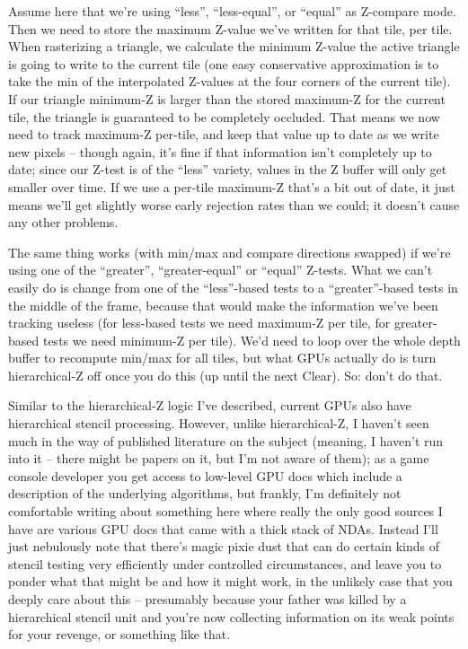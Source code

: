\documentclass[12pt]{article}
\begin{document}
Assume here that we’re using “less”, “less-equal”, or “equal” as Z-compare mode. Then we need to store the maximum Z-value we’ve written for that tile, per tile. When rasterizing a triangle, we calculate the minimum Z-value the active triangle is going to write to the current tile (one easy conservative approximation is to take the min of the interpolated Z-values at the four corners of the current tile). If our triangle minimum-Z is larger than the stored maximum-Z for the current tile, the triangle is guaranteed to be completely occluded. That means we now need to track maximum-Z per-tile, and keep that value up to date as we write new pixels – though again, it’s fine if that information isn’t completely up to date; since our Z-test is of the “less” variety, values in the Z buffer will only get smaller over time. If we use a per-tile maximum-Z that’s a bit out of date, it just means we’ll get slightly worse early rejection rates than we could; it doesn’t cause any other problems.

The same thing works (with min/max and compare directions swapped) if we’re using one of the “greater”, “greater-equal” or “equal” Z-tests. What we can’t easily do is change from one of the “less”-based tests to a “greater”-based tests in the middle of the frame, because that would make the information we’ve been tracking useless (for less-based tests we need maximum-Z per tile, for greater-based tests we need minimum-Z per tile). We’d need to loop over the whole depth buffer to recompute min/max for all tiles, but what GPUs actually do is turn hierarchical-Z off once you do this (up until the next Clear). So: don’t do that.

Similar to the hierarchical-Z logic I’ve described, current GPUs also have hierarchical stencil processing. However, unlike hierarchical-Z, I haven’t seen much in the way of published literature on the subject (meaning, I haven’t run into it – there might be papers on it, but I’m not aware of them); as a game console developer you get access to low-level GPU docs which include a description of the underlying algorithms, but frankly, I’m definitely not comfortable writing about something here where really the only good sources I have are various GPU docs that came with a thick stack of NDAs. Instead I’ll just nebulously note that there’s magic pixie dust that can do certain kinds of stencil testing very efficiently under controlled circumstances, and leave you to ponder what that might be and how it might work, in the unlikely case that you deeply care about this – presumably because your father was killed by a hierarchical stencil unit and you’re now collecting information on its weak points for your revenge, or something like that.
\end{document}
